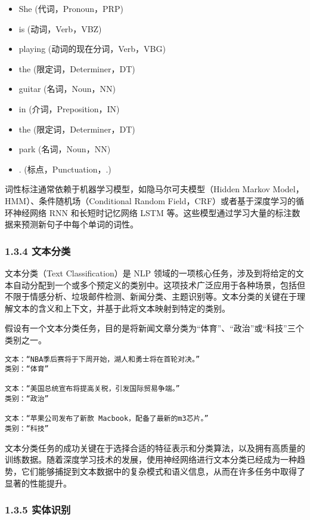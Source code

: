 \documentclass[12pt,a4paper]{book}
\begin{document}
\begin{itemize}
\tightlist
\item
  She (代词，Pronoun，PRP)
\item
  is (动词，Verb，VBZ)
\item
  playing (动词的现在分词，Verb，VBG)
\item
  the (限定词，Determiner，DT)
\item
  guitar (名词，Noun，NN)
\item
  in (介词，Preposition，IN)
\item
  the (限定词，Determiner，DT)
\item
  park (名词，Noun，NN)
\item
  . (标点，Punctuation，.)
\end{itemize}

词性标注通常依赖于机器学习模型，如隐马尔可夫模型（Hidden Markov
Model，HMM）、条件随机场（Conditional Random
Field，CRF）或者基于深度学习的循环神经网络 RNN 和长短时记忆网络 LSTM
等。这些模型通过学习大量的标注数据来预测新句子中每个单词的词性。

\subsubsection{1.3.4 文本分类}\label{ux6587ux672cux5206ux7c7b}

文本分类（Text Classification）是 NLP
领域的一项核心任务，涉及到将给定的文本自动分配到一个或多个预定义的类别中。这项技术广泛应用于各种场景，包括但不限于情感分析、垃圾邮件检测、新闻分类、主题识别等。文本分类的关键在于理解文本的含义和上下文，并基于此将文本映射到特定的类别。

假设有一个文本分类任务，目的是将新闻文章分类为``体育''、``政治''或``科技''三个类别之一。

\begin{verbatim}
文本：“NBA季后赛将于下周开始，湖人和勇士将在首轮对决。”
类别：“体育”

文本：“美国总统宣布将提高关税，引发国际贸易争端。”
类别：“政治”

文本：“苹果公司发布了新款 Macbook，配备了最新的m3芯片。”
类别：“科技”
\end{verbatim}

文本分类任务的成功关键在于选择合适的特征表示和分类算法，以及拥有高质量的训练数据。随着深度学习技术的发展，使用神经网络进行文本分类已经成为一种趋势，它们能够捕捉到文本数据中的复杂模式和语义信息，从而在许多任务中取得了显著的性能提升。

\subsubsection{1.3.5 实体识别}\label{ux5b9eux4f53ux8bc6ux522b}
\end{document}
